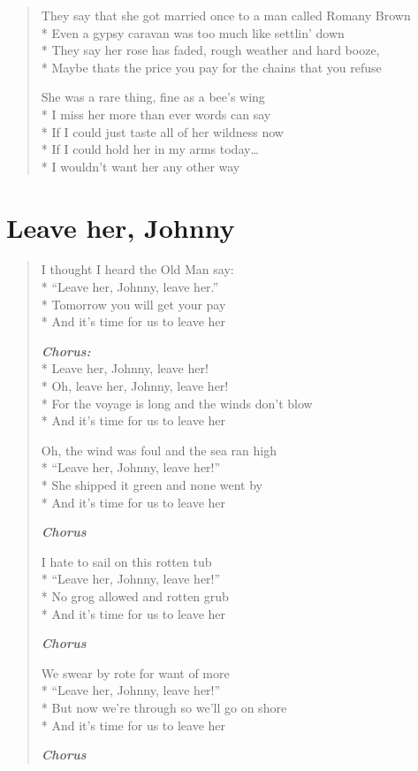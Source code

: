 \documentclass[9pt,twoside]{extarticle}
\newenvironment{xverse}{
	\begin{verse}
	\fontsize{8.5}{10.5}\selectfont
	}
	{
	\end{verse}
	\penalty 0
}
\newcommand{\chorusdef}{\textbf{\emph{Chorus:}}\\*}
\newcommand{\chorusmark}[1][1]{%
\vspace{-0.5\stanzaskip}%
\textbf{\emph{Chorus \ifthenelse{\equal{#1}{1}}{}{$\times$ #1}}}%
\vspace{-0.5\stanzaskip}%
}
\begin{document}
\begin{xverse}
They say that she got married once to a man called Romany Brown \\*
Even a gypsy caravan was too much like settlin’ down \\*
They say her rose has faded, rough weather and hard booze, \\*
Maybe thats the price you pay for the chains that you refuse

She was a rare thing, fine as a bee’s wing \\*
I miss her more than ever words can say \\*
If I could just taste all of her wildness now \\*
If I could hold her in my arms today… \\*
I wouldn’t want her any other way
\end{xverse}

\section{Leave her, Johnny}

\begin{xverse}
I thought I heard the Old Man say: \\*
“Leave her, Johnny, leave her.” \\*
Tomorrow you will get your pay \\*
And it’s time for us to leave her

\chorusdef
Leave her, Johnny, leave her! \\*
Oh, leave her, Johnny, leave her! \\*
For the voyage is long and the winds don’t blow \\*
And it’s time for us to leave her

Oh, the wind was foul and the sea ran high \\*
“Leave her, Johnny, leave her!” \\*
She shipped it green and none went by \\*
And it’s time for us to leave her

\chorusmark

I hate to sail on this rotten tub \\*
“Leave her, Johnny, leave her!” \\*
No grog allowed and rotten grub \\*
And it’s time for us to leave her

\chorusmark

We swear by rote for want of more \\*
“Leave her, Johnny, leave her!” \\*
But now we’re through so we’ll go on shore \\*
And it’s time for us to leave her

\chorusmark
\end{xverse}
\end{document}
